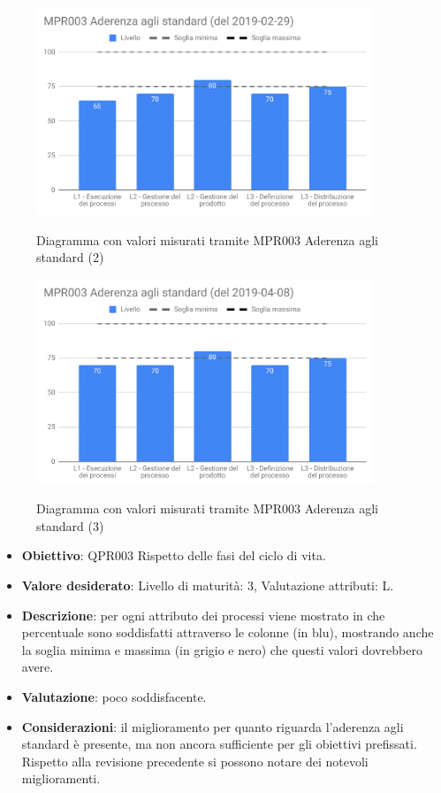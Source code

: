 	\begin{figure}[H]
		\centering
		\includegraphics[width=0.9\textwidth]{img/cruscotti/RQ/MPR003(2).png}
		\label{immagineAderenzaStandard2RP}
		\caption{Diagramma con valori misurati tramite MPR003 Aderenza agli standard (2)}
	\end{figure}
	
	\begin{figure}[H]
		\centering
		\includegraphics[width=0.9\textwidth]{img/cruscotti/RQ/MPR003(3).png}
		\label{immagineAderenzaStandard3RP}
		\caption{Diagramma con valori misurati tramite MPR003 Aderenza agli standard (3)}
	\end{figure}
	
	\begin{itemize}
		\item \textbf{Obiettivo}: QPR003 Rispetto delle fasi del ciclo di vita.
		\item \textbf{Valore desiderato}: Livello di maturità: 3, Valutazione attributi: L.
		\item \textbf{Descrizione}: per ogni attributo dei processi viene mostrato in che percentuale sono soddisfatti attraverso le colonne (in blu), mostrando anche la soglia minima e massima (in grigio e nero) che questi valori dovrebbero avere.
		\item \textbf{Valutazione}: poco soddisfacente.
		\item \textbf{Considerazioni}: il miglioramento per quanto riguarda l'aderenza agli standard è presente, ma non ancora sufficiente per gli obiettivi prefissati. Rispetto alla revisione precedente
		si possono notare dei notevoli miglioramenti.
	\end{itemize}

